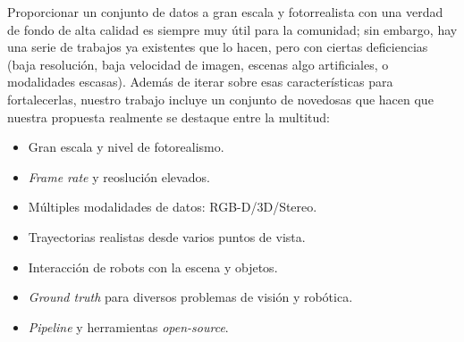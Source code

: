 Proporcionar un conjunto de datos a gran escala y fotorrealista con una verdad de fondo de alta calidad es siempre muy útil para la comunidad; sin embargo, hay una serie de trabajos ya existentes que lo hacen, pero con ciertas deficiencias (baja resolución, baja velocidad de imagen, escenas algo artificiales, o modalidades escasas). Además de iterar sobre esas características para fortalecerlas, nuestro trabajo incluye un conjunto de novedosas que hacen que nuestra propuesta realmente se destaque entre la multitud:

\begin{itemize}
    \item Gran escala y nivel de fotorealismo.
    \item \emph{Frame rate} y reoslución elevados.
    \item Múltiples modalidades de datos: RGB-D/3D/Stereo.
	\item Trayectorias realistas desde varios puntos de vista.
	\item Interacción de robots con la escena y objetos.
    \item \emph{Ground truth} para diversos problemas de visión y robótica.
    \item \emph{Pipeline} y herramientas \emph{open-source}.
\end{itemize}